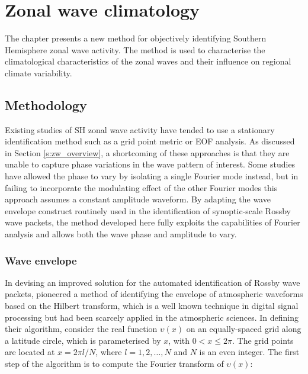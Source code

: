 
\chapter{Zonal wave climatology}\label{c:zw_climatology}


\begin{synopsis}

The chapter presents a new method for objectively identifying Southern Hemisphere zonal wave activity. The method is used to characterise the climatological characteristics of the zonal waves and their influence on regional climate variability.

\end{synopsis}



\section{Methodology}

Existing studies of SH zonal wave activity have tended to use a stationary identification method such as a grid point metric or EOF analysis. As discussed in Section \ref{s:zw_overview}, a shortcoming of these approaches is that they are unable to capture phase variations in the wave pattern of interest. Some studies have allowed the phase to vary by isolating a single Fourier mode instead, but in failing to incorporate the modulating effect of the other Fourier modes this approach assumes a constant amplitude waveform. By adapting the wave envelope construct routinely used in the identification of synoptic-scale Rossby wave packets, the method developed here fully exploits the capabilities of Fourier analysis and allows both the wave phase and amplitude to vary.
 
 
\subsection{Wave envelope}

In devising an improved solution for the automated identification of Rossby wave packets, \citet{Zimin2003} pioneered a method of identifying the envelope of atmospheric waveforms based on the Hilbert transform, which is a well known technique in digital signal processing but had been scarcely applied in the atmospheric sciences. In defining their algorithm, \citet{Zimin2003} consider the real function $\upsilon(x)$ on an equally-spaced grid along a latitude circle, which is parameterised by $x$, with $0 < x \leq 2\pi$. The grid points are located at $x = 2 \pi l / N$, where $l = 1, 2, \dotsc, N$ and $N$ is an even integer. The first step of the algorithm is to compute the Fourier transform of $\upsilon(x)$:

